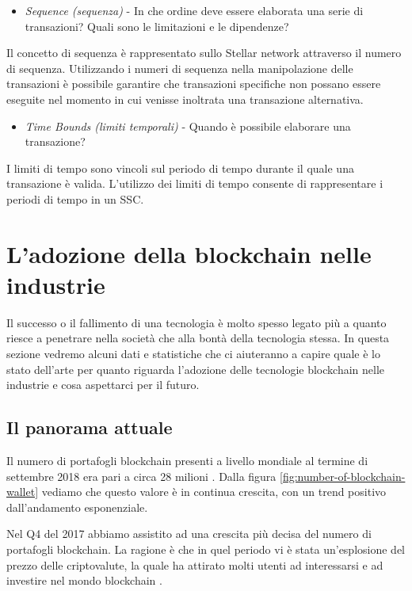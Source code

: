 \begin{itemize}
	\item \textit{Sequence (sequenza)} -
	      In che ordine deve essere elaborata una serie di transazioni?
	      Quali sono le limitazioni e le dipendenze?
\end{itemize}
Il concetto di sequenza è rappresentato sullo Stellar network attraverso
il numero di sequenza. Utilizzando i numeri di sequenza
nella manipolazione delle transazioni è possibile garantire che
transazioni specifiche non possano essere eseguite
nel momento in cui venisse inoltrata una transazione alternativa.

\begin{itemize}
	\item \textit{Time Bounds (limiti temporali)} -
	      Quando è possibile elaborare una transazione?
\end{itemize}
I limiti di tempo sono vincoli sul periodo di tempo durante il quale
una transazione è valida. L'utilizzo dei limiti di tempo
consente di rappresentare i periodi di tempo in un SSC.

\section{L'adozione della blockchain nelle industrie}
Il successo o il fallimento di una tecnologia è molto spesso legato più a quanto riesce a penetrare
nella società che alla bontà della tecnologia stessa.
In questa sezione vedremo alcuni dati e statistiche che ci aiuteranno a capire quale è
lo stato dell'arte per quanto riguarda l'adozione delle tecnologie blockchain nelle industrie
e cosa aspettarci per il futuro.

\subsection{Il panorama attuale}
Il numero di portafogli blockchain presenti a livello mondiale al termine di settembre 2018
era pari a circa 28 milioni \cite{number-of-blockchain-wallet}.
Dalla figura \ref{fig:number-of-blockchain-wallet} vediamo che questo valore è in continua crescita,
con un trend positivo dall'andamento esponenziale.

Nel Q4 del 2017 abbiamo assistito ad una crescita più decisa del numero di portafogli blockchain.
La ragione è che in quel periodo vi è stata un'esplosione del prezzo delle criptovalute, la quale
ha attirato molti utenti ad interessarsi e ad investire nel mondo blockchain \cite{bitcoin-price-boom}.

